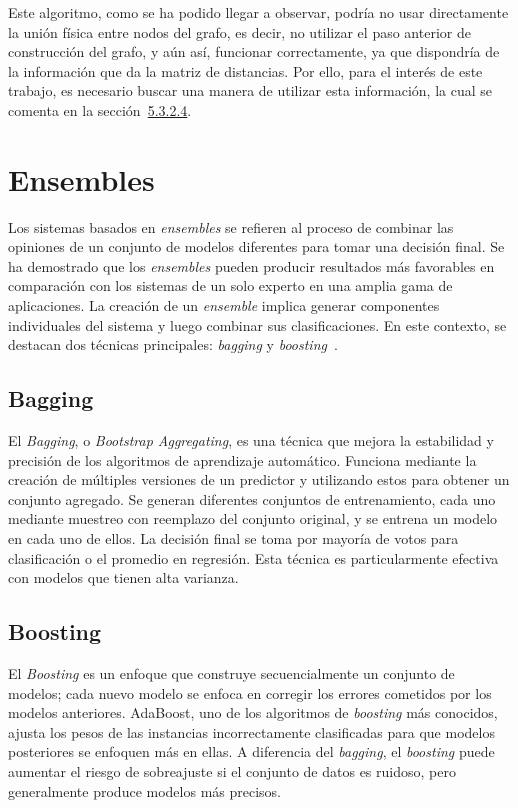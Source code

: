Este algoritmo, como se ha podido llegar a observar, podría no usar directamente la unión física entre nodos del grafo, es decir, no utilizar el paso anterior de construcción del grafo, y aún así, funcionar correctamente, ya que dispondría de la información que da la matriz de distancias. Por ello, para el interés de este trabajo, es necesario buscar una manera de utilizar esta información, la cual se comenta en la sección~\hyperref[sec5:LGC]{5.3.2.4}.
\clearpage
\section{Ensembles}
Los sistemas basados en \textit{ensembles} se refieren al proceso de combinar las opiniones de un conjunto de modelos diferentes para tomar una decisión final. Se ha demostrado que los \textit{ensembles} pueden producir resultados más favorables en comparación con los sistemas de un solo experto en una amplia gama de aplicaciones. La creación de un \textit{ensemble} implica generar componentes individuales del sistema y luego combinar sus clasificaciones. En este contexto, se destacan dos técnicas principales: \textit{bagging} y \textit{boosting}~\cite{ensembles}.

\subsection{Bagging}
El \textit{Bagging}, o \textit{Bootstrap Aggregating}, es una técnica que mejora la estabilidad y precisión de los algoritmos de aprendizaje automático. Funciona mediante la creación de múltiples versiones de un predictor y utilizando estos para obtener un conjunto agregado. Se generan diferentes conjuntos de entrenamiento, cada uno mediante muestreo con reemplazo del conjunto original, y se entrena un modelo en cada uno de ellos. La decisión final se toma por mayoría de votos para clasificación o el promedio en regresión. Esta técnica es particularmente efectiva con modelos que tienen alta varianza.

\subsection{Boosting}
El \textit{Boosting} es un enfoque que construye secuencialmente un conjunto de modelos; cada nuevo modelo se enfoca en corregir los errores cometidos por los modelos anteriores. AdaBoost, uno de los algoritmos de \textit{boosting} más conocidos, ajusta los pesos de las instancias incorrectamente clasificadas para que modelos posteriores se enfoquen más en ellas. A diferencia del \textit{bagging}, el \textit{boosting} puede aumentar el riesgo de sobreajuste si el conjunto de datos es ruidoso, pero generalmente produce modelos más precisos.


